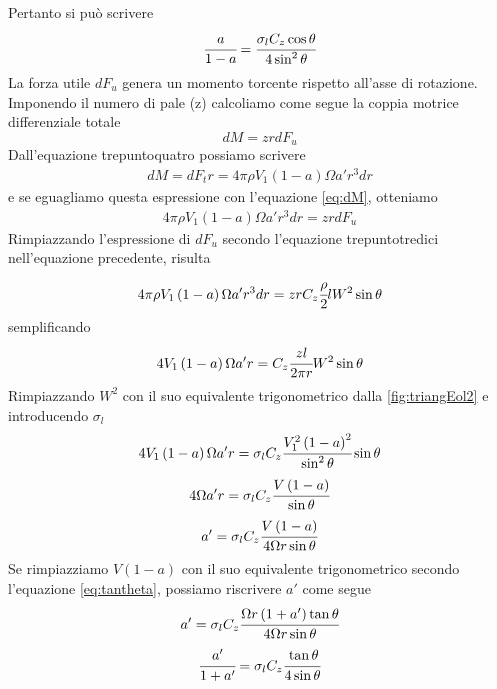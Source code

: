 Pertanto si può scrivere
\begin{equation}\label{eq:asolid}
\cfrac{a}{1-a} = \cfrac{\sigma_l C_z \cos \theta}{4 \sin^2 \theta}
\end{equation}
La forza utile $dF_u$ genera un momento torcente rispetto all'asse di rotazione. Imponendo il numero di pale (z) calcoliamo come segue la coppia motrice differenziale totale
\begin{equation}\label{eq:dM}
dM = z r dF_u
\end{equation}
Dall'equazione trepuntoquatro possiamo scrivere
\begin{align*}
dM = dF_t r = 4 \pi \rho V_1 \left( 1- a \right) \Omega a' r^3 dr
\end{align*}
e se eguagliamo questa espressione con l'equazione \ref{eq:dM}, otteniamo
\begin{align*}
4 \pi \rho V_1 \left(1-a \right) \Omega a' r^3 dr = z r dF_u
\end{align*}
Rimpiazzando l'espressione di $dF_u$ secondo l'equazione trepuntotredici nell'equazione precedente, risulta
\begin{align*}
4 \pi \rho V_1 \left(1-a \right) \Omega a' r^3 dr = z r C_z \cfrac{\rho}{2} l W^2 \sin \theta
\end{align*}
semplificando
\begin{align*}
4 V_1 \left(1-a \right) \Omega a' r = C_z \cfrac{z l }{2 \pi r} W^2 \sin \theta
\end{align*}
Rimpiazzando $W^2$ con il suo equivalente trigonometrico dalla \ref{fig:triangEol2} e introducendo $\sigma_l$
\begin{align*}
4 V_1 \left(1-a \right) \Omega a' r = \sigma_l C_z \cfrac{V_1^2 \left(1-a \right)^2}{\sin^2 \theta} \sin \theta
\end{align*}
\begin{align*}
4 \Omega a' r = \sigma_l C_z \cfrac{V \left(1-a \right)}{\sin \theta}
\end{align*}
\begin{align*}
a'= \sigma_l C_z \cfrac{V \left(1-a \right)}{4 \Omega r \sin \theta}
\end{align*}
Se rimpiazziamo $V \left(1-a\right)$ con il suo equivalente trigonometrico secondo l'equazione \ref{eq:tantheta}, possiamo riscrivere $a'$ come segue
\begin{align*}
a' = \sigma_l C_z \cfrac{\Omega r \left(1+a' \right) \tan \theta}{4 \Omega r \sin \theta}
\end{align*}
\begin{align*}
\cfrac{a'}{1+a'} = \sigma_l C_z \cfrac{\tan \theta}{4 \sin \theta}
\end{align*}
